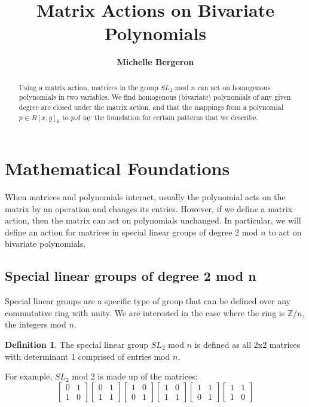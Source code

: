 \documentclass[a4paper,draft]{amsproc}
\title[Matrix Actions]{Matrix Actions on Bivariate Polynomials}
\author[Bergeron]{\bfseries Michelle Bergeron}
\theoremstyle{plain}
\theoremstyle{definition}
\newtheorem{dfn}{Definition}[section]
\theoremstyle{remark}
\numberwithin{equation}{section}
\begin{document}
\vspace{18mm} \setcounter{page}{1} \thispagestyle{empty}


\begin{abstract}
Using a matrix action, matrices in the group $SL_{2}$ mod $n$ can act on homogenous polynomials in two variables. We find homogenous (bivariate) polynomials of any given degree are closed under the matrix action, and that the mappings from a polynomial $p \in R[x,y]_{k}$ to  $p\mathcal{A}$ lay the foundation for certain patterns that we describe. 
\end{abstract}

\maketitle

\section{Mathematical Foundations} 

When matrices and polynomials interact, usually the polynomial acts on the matrix by an operation and changes its entries. However, if we define a matrix action, then the matrix can act on polynomials unchanged. In particular, we will define an action for matrices in special linear groups of degree 2 mod $n$ to act on bivariate polynomials. 

\subsection{Special linear groups of degree 2 mod n}
Special linear groups are a specific type of group that can be defined over any commutative ring with unity. We are interested in the case where the ring is $\mathbb{Z}/n$, the integers mod $n$. 
\begin{dfn}
The special linear group $SL_{2}$ mod $n$ is defined as all 2x2 matrices with determinant 1 comprised of entries mod $n$.
\end{dfn}

For example, $SL_{2}$ mod 2 is made up of the matrices:
$$
\begin{bmatrix}
 0&1 \\ 
 1&0 
\end{bmatrix}
\begin{bmatrix}
 0&1 \\ 
 1&1 
\end{bmatrix}
\begin{bmatrix}
 1&0 \\ 
 0&1 
\end{bmatrix}
\begin{bmatrix}
 1&0 \\ 
 1&1 
\end{bmatrix}
\begin{bmatrix}
 1&1 \\ 
 0&1 
\end{bmatrix}
\begin{bmatrix}
 1&1 \\ 
 1&0 
\end{bmatrix}
$$
\end{document}
